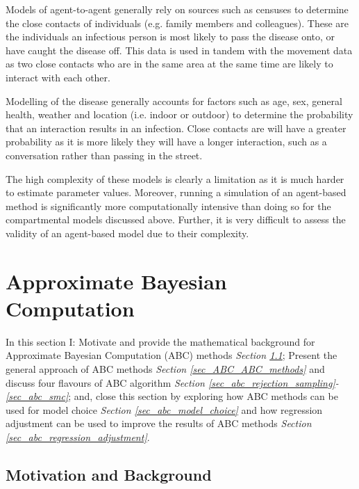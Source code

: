 \documentclass[11pt,a4paper]{article}
\theoremstyle{break}
\begin{document}
  \par Models of agent-to-agent generally rely on sources such as censuses to determine the close contacts of individuals (e.g. family members and colleagues). These are the individuals an infectious person is most likely to pass the disease onto, or have caught the disease off. This data is used in tandem with the movement data as two close contacts who are in the same area at the same time are likely to interact with each other.

  \par Modelling of the disease generally accounts for factors such as age, sex, general health, weather and location (i.e. indoor or outdoor) to determine the probability that an interaction results in an infection. Close contacts are will have a greater probability as it is more likely they will have a longer interaction, such as a conversation rather than passing in the street.

  \par The high complexity of these models is clearly a limitation as it is much harder to estimate parameter values. Moreover, running a simulation of an agent-based method is significantly more computationally intensive than doing so for the compartmental models discussed above. Further, it is very difficult to assess the validity of an agent-based model due to their complexity.

\newpage
\section{Approximate Bayesian Computation}\label{sec_ABC}

  \par In this section I: Motivate and provide the mathematical background for Approximate Bayesian Computation (ABC) methods \textit{Section \ref{sec_ABC_background}}; Present the general approach of ABC methods \textit{Section \ref{sec_ABC_ABC_methods}} and discuss four flavours of ABC algorithm \textit{Section \ref{sec_abc_rejection_sampling}-\ref{sec_abc_smc}}; and, close this section by exploring how ABC methods can be used for model choice \textit{Section \ref{sec_abc_model_choice}} and how regression adjustment can be used to improve the results of ABC methods \textit{Section \ref{sec_abc_regression_adjustment}}.

\subsection{Motivation and Background}\label{sec_ABC_background}
\end{document}
